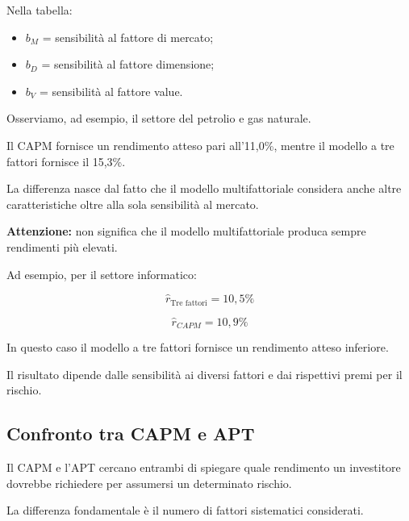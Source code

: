 \noindent Nella tabella:

\begin{itemize}
    \item $b_M$ = sensibilità al fattore di mercato;
    \item $b_D$ = sensibilità al fattore dimensione;
    \item $b_V$ = sensibilità al fattore value.
\end{itemize}

\noindent Osserviamo, ad esempio,
il settore del petrolio e gas naturale.

\medskip

\noindent Il CAPM fornisce un rendimento
atteso pari all'11,0\%, mentre il modello
a tre fattori fornisce il 15,3\%.

\medskip

\noindent La differenza nasce dal fatto
che il modello multifattoriale considera
anche altre caratteristiche oltre
alla sola sensibilità al mercato.

\medskip

\noindent \textbf{Attenzione:} non significa
che il modello multifattoriale produca
sempre rendimenti più elevati.

\medskip

\noindent Ad esempio, per il settore informatico:

\[
\hat{r}_{\text{Tre fattori}}=10{,}5\%
\]

\[
\hat{r}_{CAPM}=10{,}9\%
\]

\noindent In questo caso il modello a tre fattori
fornisce un rendimento atteso inferiore.

\medskip

\noindent Il risultato dipende dalle sensibilità
ai diversi fattori e dai rispettivi premi
per il rischio.


\subsection{Confronto tra CAPM e APT}

\noindent Il CAPM e l'APT cercano entrambi
di spiegare quale rendimento un investitore
dovrebbe richiedere per assumersi
un determinato rischio.

\medskip

\noindent La differenza fondamentale è
il numero di fattori sistematici considerati.

\begin{center}
\end{center}

